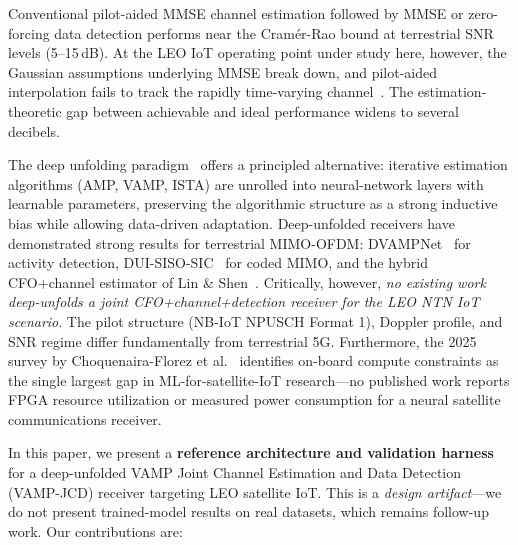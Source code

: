 \documentclass{article}
\begin{document}
Conventional pilot-aided MMSE channel estimation followed by MMSE or zero-forcing data detection performs near the Cram\'er-Rao bound at terrestrial SNR levels (5--15\,dB). At the LEO IoT operating point under study here, however, the Gaussian assumptions underlying MMSE break down, and pilot-aided interpolation fails to track the rapidly time-varying channel~\cite{3gppTR38811}. The estimation-theoretic gap between achievable and ideal performance widens to several decibels.

The deep unfolding paradigm~\cite{gregor2010learning,borgerding2017amp,monga2021algorithm} offers a principled alternative: iterative estimation algorithms (AMP, VAMP, ISTA) are unrolled into neural-network layers with learnable parameters, preserving the algorithmic structure as a strong inductive bias while allowing data-driven adaptation. Deep-unfolded receivers have demonstrated strong results for terrestrial MIMO-OFDM: DVAMPNet~\cite{hou2025dvampnet} for activity detection, DUI-SISO-SIC~\cite{mazumdar2024dui} for coded MIMO, and the hybrid CFO+channel estimator of Lin \& Shen~\cite{lin2024hybrid}. Critically, however, \emph{no existing work deep-unfolds a joint CFO+channel+detection receiver for the LEO NTN IoT scenario}. The pilot structure (NB-IoT NPUSCH Format 1), Doppler profile, and SNR regime differ fundamentally from terrestrial 5G. Furthermore, the 2025 survey by Choquenaira-Florez et al.~\cite{choquenaira2025ml} identifies on-board compute constraints as the single largest gap in ML-for-satellite-IoT research---no published work reports FPGA resource utilization or measured power consumption for a neural satellite communications receiver.

In this paper, we present a \textbf{reference architecture and validation harness} for a deep-unfolded VAMP Joint Channel Estimation and Data Detection (VAMP-JCD) receiver targeting LEO satellite IoT. This is a \emph{design artifact}---we do not present trained-model results on real datasets, which remains follow-up work. Our contributions are:
\end{document}
